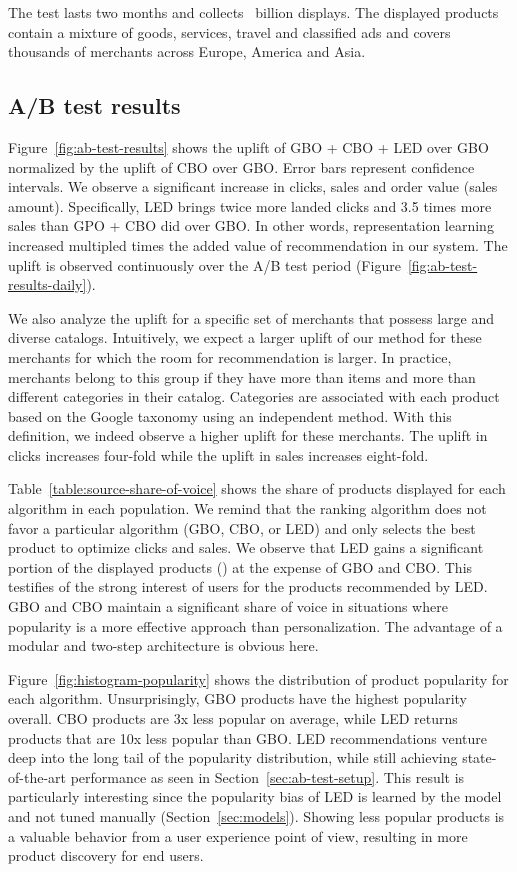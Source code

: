 \documentclass[sigconf]{acmart}
\begin{document}
The test lasts two months and collects ~billion displays. The displayed products contain a mixture of goods, services, travel and classified ads and covers thousands of merchants across Europe, America and Asia.

\subsection{A/B test results}
\label{ab-test-results}
 Figure~\ref{fig:ab-test-results} shows the uplift of GBO + CBO + LED over GBO normalized by the uplift of CBO over GBO. Error bars represent  confidence intervals. We observe a significant increase in clicks, sales and order value (sales amount). Specifically, LED brings twice more landed clicks and 3.5 times more sales than GPO + CBO did over GBO. In other words, representation learning increased multipled times the added value of recommendation in our system. The uplift is observed continuously over the A/B test period (Figure~\ref{fig:ab-test-results-daily}).
 
 We also analyze the uplift for a specific set of merchants that possess large and diverse catalogs. Intuitively, we expect a larger uplift of our method for these merchants for which the room for recommendation is larger. In practice, merchants belong to this group if they have more than  items and more than  different categories in their catalog. Categories are associated with each product based on the Google taxonomy using an independent method. With this definition, we indeed observe a higher uplift for these merchants. The uplift in clicks increases four-fold while the uplift in sales increases eight-fold.

Table~\ref{table:source-share-of-voice} shows the share of products displayed for each algorithm in each population. We remind that the ranking algorithm does not favor a particular algorithm (GBO, CBO, or LED) and only selects the best product to optimize clicks and sales. We observe that LED gains a significant portion of the displayed products () at the expense of GBO and CBO. This testifies of the strong interest of users for the products recommended by LED. GBO and CBO maintain a significant share of voice in situations where popularity is a more effective approach than personalization. The advantage of a modular and two-step architecture is obvious here.

Figure~\ref{fig:histogram-popularity} shows the distribution of product popularity for each algorithm. Unsurprisingly, GBO products have the highest popularity overall. CBO products are 3x less popular on average, while LED returns products that are 10x less popular than GBO. LED recommendations venture deep into the long tail of the popularity distribution, while still achieving state-of-the-art performance as seen in Section~\ref{sec:ab-test-setup}. This result is particularly interesting since the popularity bias of LED is learned by the model and not tuned manually (Section~\ref{sec:models}). Showing less popular products is a valuable behavior from a user experience point of view, resulting in more product discovery for end users.
\end{document}
